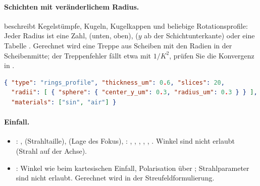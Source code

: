 \paragraph{Schichten mit veränderlichem Radius.}  beschreibt Kegelstümpfe, Kugeln, Kugelkappen
und beliebige Rotationsprofile: Jeder Radius ist eine Zahl,  (unten, oben),
 ($y$ ab der Schichtunterkante) oder eine Tabelle
. Gerechnet wird eine Treppe aus  Scheiben mit den
Radien in der Scheibenmitte; der Treppenfehler fällt etwa mit $1/K^2$, prüfen Sie die Konvergenz in .
\begin{lstlisting}[language=json]
{ "type": "rings_profile", "thickness_um": 0.6, "slices": 20,
  "radii": [ { "sphere": { "center_y_um": 0.3, "radius_um": 0.3 } } ],
  "materials": ["sin", "air"] }
\end{lstlisting}
\paragraph{Einfall.}
\begin{itemize}
  \item {}: ,  (Strahltaille),  (Lage des Fokus),
        : , , , , ,
        . Winkel sind nicht erlaubt (Strahl auf der Achse).
  \item {}: Winkel wie beim kartesischen Einfall, Polarisation über ; Strahlparameter
        sind nicht erlaubt. Gerechnet wird in der Streufeldformulierung.
\end{itemize}
